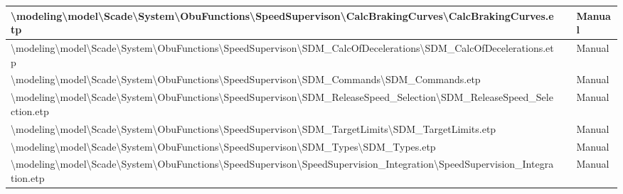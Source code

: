 \begin{longtable}{|>{\RaggedRight}p{}|>{\RaggedRight}p{}|>{\RaggedRight}p{}|}
\hline
\textbackslash \allowbreak modeling\textbackslash \allowbreak model\textbackslash \allowbreak Scade\textbackslash \allowbreak System\textbackslash \allowbreak ObuFunctions\textbackslash \allowbreak SpeedSupervison\textbackslash \allowbreak CalcBrakingCurves\textbackslash \allowbreak CalcBrakingCurves.etp& &Manual\\
\hline
\textbackslash \allowbreak modeling\textbackslash \allowbreak model\textbackslash \allowbreak Scade\textbackslash \allowbreak System\textbackslash \allowbreak ObuFunctions\textbackslash \allowbreak SpeedSupervison\textbackslash \allowbreak SDM\_\allowbreak CalcOfDecelerations\textbackslash \allowbreak SDM\_\allowbreak CalcOfDecelerations.etp& &Manual\\
\hline
\textbackslash \allowbreak modeling\textbackslash \allowbreak model\textbackslash \allowbreak Scade\textbackslash \allowbreak System\textbackslash \allowbreak ObuFunctions\textbackslash \allowbreak SpeedSupervison\textbackslash \allowbreak SDM\_\allowbreak Commands\textbackslash \allowbreak SDM\_\allowbreak Commands.etp& &Manual\\
\hline
\textbackslash \allowbreak modeling\textbackslash \allowbreak model\textbackslash \allowbreak Scade\textbackslash \allowbreak System\textbackslash \allowbreak ObuFunctions\textbackslash \allowbreak SpeedSupervison\textbackslash \allowbreak SDM\_\allowbreak ReleaseSpeed\_\allowbreak Selection\textbackslash \allowbreak SDM\_\allowbreak ReleaseSpeed\_\allowbreak Selection.etp& &Manual\\
\hline
\textbackslash \allowbreak modeling\textbackslash \allowbreak model\textbackslash \allowbreak Scade\textbackslash \allowbreak System\textbackslash \allowbreak ObuFunctions\textbackslash \allowbreak SpeedSupervison\textbackslash \allowbreak SDM\_\allowbreak TargetLimits\textbackslash \allowbreak SDM\_\allowbreak TargetLimits.etp& &Manual\\
\hline
\textbackslash \allowbreak modeling\textbackslash \allowbreak model\textbackslash \allowbreak Scade\textbackslash \allowbreak System\textbackslash \allowbreak ObuFunctions\textbackslash \allowbreak SpeedSupervison\textbackslash \allowbreak SDM\_\allowbreak Types\textbackslash \allowbreak SDM\_\allowbreak Types.etp& &Manual\\
\hline
\textbackslash \allowbreak modeling\textbackslash \allowbreak model\textbackslash \allowbreak Scade\textbackslash \allowbreak System\textbackslash \allowbreak ObuFunctions\textbackslash \allowbreak SpeedSupervison\textbackslash \allowbreak SpeedSupervision\_\allowbreak Integration\textbackslash \allowbreak SpeedSupervision\_\allowbreak Integration.etp& &Manual\\

\end{longtable}
